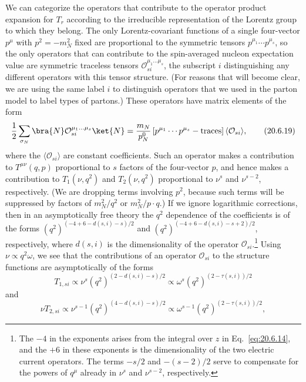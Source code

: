 We can categorize the operators that contribute to the operator product expansion for $T_r$ according to the irreducible representation of the Lorentz group to which they belong. The only Lorentz-covariant functions of a single four-vector $p^\mu$ with $p^2=-m_N^2$ fixed are proportional to the symmetric tensors $p^{\mu_1}\cdots p^{\mu_s}$, so the only operators that can contribute to the spin-averaged nucleon expectation value are symmetric traceless tensors $\mathcal O_{si}^{\mu_1\ldots\mu_s}$, the subscript $i$ distinguishing any different operators with this tensor structure. (For reasons that will become clear, we are using the same label $i$ to distinguish operators that we used in the parton model to label types of partons.) These operators have matrix elements of the form
\begin{equation}
\frac12\sum_{\sigma_N}
\bra{N}\mathcal O_{si}^{\mu_1\ldots\mu_s}\ket{N}
=\frac{m_N}{p_N^0}
\left[p^{\mu_1}\cdots p^{\mu_s}-\text{traces}\right]
\langle\mathcal O_{si}\rangle,
\tag{20.6.19}\label{eq:20.6.19}
\end{equation}
where the $\langle\mathcal O_{si}\rangle$ are constant coefficients. Such an operator makes a contribution to $T^{\mu\nu}(q,p)$ proportional to $s$ factors of the four-vector $p$, and hence makes a contribution to $T_1(\nu,q^2)$ and $T_2(\nu,q^2)$ proportional to $\nu^s$ and $\nu^{s-2}$, respectively. (We are dropping terms involving $p^2$, because such terms will be suppressed by factors of $m_N^2/q^2$ or $m_N^2/p\cdot q$.) If we ignore logarithmic corrections, then in an asymptotically free theory the $q^2$ dependence of the coefficients is of the forms $(q^2)^{(-4+6-d(s,i)-s)/2}$ and $(q^2)^{(-4+6-d(s,i)-s+2)/2}$, respectively, where $d(s,i)$ is the dimensionality of the operator $\mathcal O_{si}$.\footnote{The $-4$ in the exponents arises from the integral over $z$ in Eq.~\eqref{eq:20.6.14}, and the $+6$ in these exponents is the dimensionality of the two electric current operators. The terms $-s/2$ and $-(s-2)/2$ serve to compensate for the powers of $q^\mu$ already in $\nu^s$ and $\nu^{s-2}$, respectively.} Using $\nu\propto q^2\omega$, we see that the contributions of an operator $\mathcal O_{si}$ to the structure functions are asymptotically of the forms
\begin{equation}
T_{1,si}\propto
\nu^s(q^2)^{(2-d(s,i)-s)/2}
\propto
\omega^s(q^2)^{(2-\tau(s,i))/2}
\tag{20.6.20}\label{eq:20.6.20}
\end{equation}
and
\begin{equation}
\nu T_{2,si}\propto
\nu^{s-1}(q^2)^{(4-d(s,i)-s)/2}
\propto
\omega^{s-1}(q^2)^{(2-\tau(s,i))/2},
\tag{20.6.21}\label{eq:20.6.21}
\end{equation}
